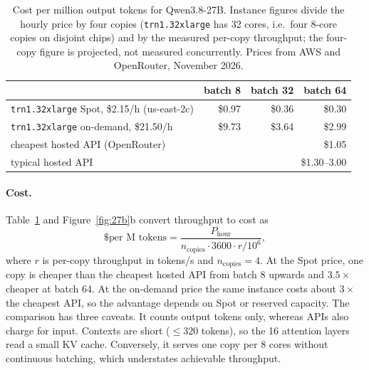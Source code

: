 \documentclass[11pt]{article}
\theoremstyle{remark}
\begin{document}
\begin{table}[t]
\centering
\caption{Cost per million output tokens for Qwen3.8-27B. Instance figures divide the hourly price by four copies
(\texttt{trn1.32xlarge} has 32 cores, i.e.\ four 8-core copies on disjoint chips) and by the measured per-copy throughput; the
four-copy figure is projected, not measured concurrently. Prices from AWS and OpenRouter, November 2026.}
\label{tab:cost}
\begin{tabular}{lrrr}
\toprule
 & batch 8 & batch 32 & batch 64 \\
\midrule
\texttt{trn1.32xlarge} Spot, \$2.15/h (us-east-2c) & \$0.97 & \$0.36 & \$0.30 \\
\texttt{trn1.32xlarge} on-demand, \$21.50/h & \$9.73 & \$3.64 & \$2.99 \\
\midrule
cheapest hosted API (OpenRouter) & \multicolumn{3}{r}{\$1.05} \\
typical hosted API & \multicolumn{3}{r}{\$1.30--3.00} \\
\bottomrule
\end{tabular}
\end{table}

\paragraph{Cost.} Table~\ref{tab:cost} and Figure~\ref{fig:27b}b convert throughput to cost as
\begin{equation}
\text{\$ per M tokens} = \frac{P_{\text{hour}}}{n_{\text{copies}} \cdot 3600 \cdot r / 10^{6}},
\end{equation}
where $r$ is per-copy throughput in tokens/s and $n_{\text{copies}}=4$. At the Spot price, one copy is cheaper than the
cheapest hosted API from batch 8 upwards and $3.5\times$ cheaper at batch 64. At the on-demand price the same instance costs
about $3\times$ the cheapest API, so the advantage depends on Spot or reserved capacity. The comparison has three caveats. It
counts output tokens only, whereas APIs also charge for input. Contexts are short ($\le320$ tokens), so the 16 attention
layers read a small KV cache. Conversely, it serves one copy per 8 cores without continuous batching, which understates
achievable throughput.
\end{document}
